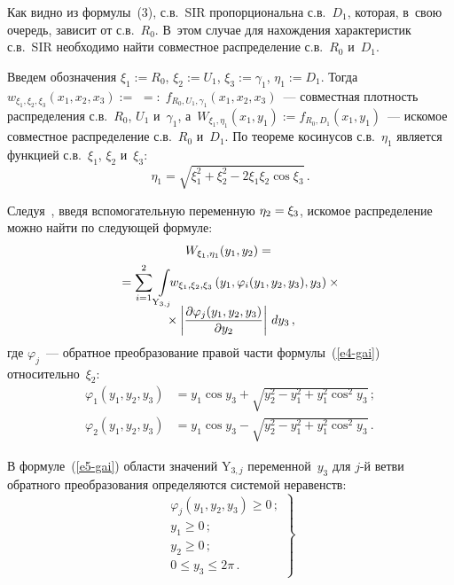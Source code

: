 \begin{multicols}{2}

  Как видно из формулы~(3), с.в.~SIR пропорциональна с.в.~$D_1$, которая,
в~свою очередь, зависит от с.в.~$R_0$. В~этом случае для нахождения
характеристик с.в.~SIR необходимо найти совместное распределение
с.в.~$R_0$ и~$D_1$.

  Введем обозначения $\xi_1{:=} R_0$, $\xi_2 {:=} U_1$, $\xi_3 {:=}
\gamma_1$, $\eta_1 {:=} D_1$. Тогда $w_{\xi_1,\xi_2,\xi_3}(x_1,x_2,x_3) {:=}$\linebreak
${=:}\;f_{R_0, U_1, \gamma_1}(x_1,x_2,x_3)$~--- совместная плот\-ность
распределения с.в.~$R_0$, $U_1$ и~$\gamma_1$, а~$W_{\xi_1,\eta_1}(x_1,y_1)
{:=} f_{R_0, D_1}(x_1,y_1)$~--- искомое совместное распределение с.в.~$R_0$
и~$D_1$. По теореме косинусов с.в.~$\eta_1$ является функцией с.в.~$\xi_1$,
$\xi_2$ и~$\xi_3$:
  \begin{equation}
  \eta_1=\sqrt{\xi_1^2+\xi_2^2-2\xi_1\xi_2\cos \xi_3}\,.
  \label{e4-gai}
  \end{equation}

  Следуя~\cite{8-gai, 9-gai}, введя вспомогательную
переменную $\eta_2\hm=\xi_3$, искомое распределение можно найти по
следующей формуле:
  \begin{multline}
W_{\xi_1, \eta_1} (y_1,y_2) ={}\\
{}=\sum\limits_{i=1}^2
\int\limits_{\mathrm{Y}_{3,j}}\!\!\! w_{\xi_1,\xi_2,\xi_3}\left(
y_1,\varphi_i(y_1,y_2,y_3),y_3\right) \times{}\\[-6pt]
{}\times
\left\vert \displaystyle\frac{\displaystyle \partial \varphi_j(y_1,y_2,y_3)\mathstrut}{\displaystyle \partial y_2\mathstrut}\right\vert\,dy_3\,,
  \label{e5-gai}
  \end{multline}
где $\varphi_j$~--- обратное преобразование правой части формулы~(\ref{e4-gai})
относительно~$\xi_2$:
\begin{align*}
\varphi_1(y_1,y_2,y_3) &= y_1\cos y_3 +\sqrt{y_2^2-y_1^2+y_1^2\cos^2 y_3}\,;\\
\varphi_2(y_1,y_2,y_3) &= y_1\cos y_3 -\sqrt{y_2^2-y_1^2+y_1^2\cos^2 y_3}\,.
\end{align*}

  В формуле~(\ref{e5-gai}) области значений Y$_{3,j}$ переменной~$y_3$ для
$j$-й вет\-ви обратного преобразования определяются системой неравенств:
  \begin{equation}
  \left.
  \begin{array}{c}
  \varphi_j(y_1,y_2,y_3)\geq0\,;\\[6pt]
  y_1\geq 0\,;\\[6pt]
  y_2\geq 0\,;\\[6pt]
  0\leq y_3\leq 2\pi\,.
  \end{array}
  \right\}
  \label{e6-gai}
  \end{equation}


\end{multicols}
